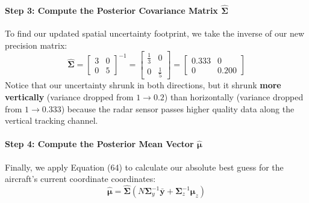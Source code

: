 \documentclass{article}
\begin{document}
\paragraph{Step 3: Compute the Posterior Covariance Matrix $\hat{\boldsymbol{\Sigma}}$}
To find our updated spatial uncertainty footprint, we take the inverse of our new precision matrix:
\begin{equation}
\hat{\boldsymbol{\Sigma}} = \begin{bmatrix} 3 & 0 \\ 0 & 5 \end{bmatrix}^{-1} = \begin{bmatrix} \frac{1}{3} & 0 \\ 0 & \frac{1}{5} \end{bmatrix} = \begin{bmatrix} 0.333 & 0 \\ 0 & 0.200 \end{bmatrix} \tag{67}
\end{equation}
Notice that our uncertainty shrunk in both directions, but it shrunk \textbf{more vertically} (variance dropped from $1 \to 0.2$) than horizontally (variance dropped from $1 \to 0.333$) because the radar sensor passes higher quality data along the vertical tracking channel.

\paragraph{Step 4: Compute the Posterior Mean Vector $\hat{\boldsymbol{\mu}}$}
Finally, we apply Equation (64) to calculate our absolute best guess for the aircraft's current coordinate coordinates:
\begin{equation*}
\hat{\boldsymbol{\mu}} = \hat{\boldsymbol{\Sigma}} \left( N\boldsymbol{\Sigma}_y^{-1}\bar{\mathbf{y}} + \boldsymbol{\Sigma}_z^{-1}\boldsymbol{\mu}_z \right)
\end{equation*}
\end{document}

